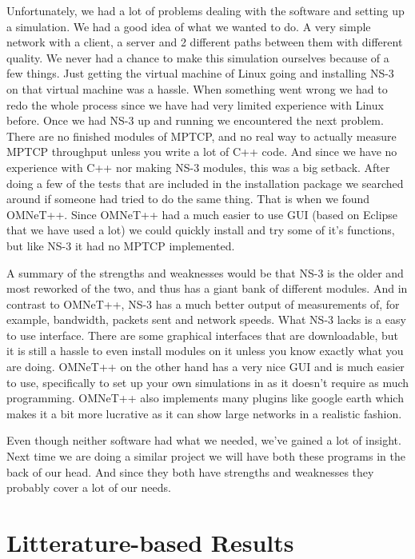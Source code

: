 \documentclass[11pt,twocolumn]{article}
\begin{document}
Unfortunately, we had a lot of problems dealing with the software and setting up a simulation. We had a good idea of what we wanted to do. A very simple network with a client, a server and 2 different paths between them with different quality. We never had a chance to make this simulation ourselves because of a few things. Just getting the virtual machine of Linux going and installing NS-3 on that virtual machine was a hassle. When something went wrong we had to redo the whole process since we have had very limited experience with Linux before. Once we had NS-3 up and running we encountered the next problem. There are no finished modules of MPTCP, and no real way to actually measure MPTCP throughput unless you write a lot of C++ code. And since we have no experience with C++ nor making NS-3 modules, this was a big setback. After doing a few of the tests that are included in the installation package we searched around if someone had tried to do the same thing. That is when we found OMNeT++. Since OMNeT++ had a much easier to use GUI (based on Eclipse that we have used a lot) we could quickly install and try some of it's functions, but like NS-3 it had no MPTCP implemented. 

A summary of the strengths and weaknesses would be that NS-3 is the older and most reworked of the two, and thus has a giant bank of different modules. And in contrast to OMNeT++, NS-3 has a much better output of measurements of, for example, bandwidth, packets sent and network speeds. What NS-3 lacks is a easy to use interface. There are some graphical interfaces that are downloadable, but it is still a hassle to even install modules on it unless you know exactly what you are doing. OMNeT++ on the other hand has a very nice GUI and is much easier to use, specifically to set up your own simulations in as it doesn't require as much programming. OMNeT++ also implements many plugins like google earth which makes it a bit more lucrative as it can show large networks in a realistic fashion.

Even though neither software had what we needed, we've gained a lot of insight. Next time we are doing a similar project we will have both these programs in the back of our head. And since they both have strengths and weaknesses they probably cover a lot of our needs.

\section{Litterature-based Results}
\end{document}
